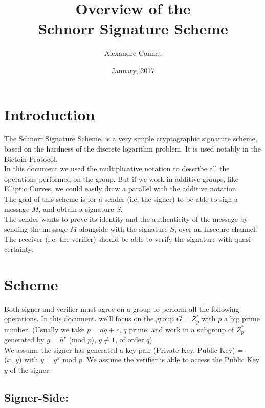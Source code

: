\documentclass{article}
\title{Overview of the\\Schnorr Signature Scheme}
\author{Alexandre Connat}
\date{January, 2017}
\begin{document}
\maketitle





\section{Introduction}

The Schnorr Signature Scheme, is a very simple cryptographic signature scheme, based on the hardness of the discrete logarithm problem. It is used notably in the Bictoin Protocol. \\
In this document we used the multiplicative notation to describe all the operations performed on the group. But if we work in additive groups, like Elliptic Curves, we could easily draw a parallel with the additive notation.  \\

\noindent
The goal of this scheme is for a sender (i.e: the signer) to be able to sign a message $M$, and obtain a signature $S$. \\
The sender wants to prove its identity and the authenticity of the message by sending the message $M$ alongside with the signature $S$, over an insecure channel. \\
The receiver (i.e: the verifier) should be able to verify the signature with quasi-certainty.







\section{Scheme}

Both signer and verifier must agree on a group to perform all the following operations. In this document, we'll focus on the group $G = Z_p^*$ with $p$ a big prime number. (Usually we take $p = aq +r$, $q$ prime; and work in a subgroup of $Z_p^*$ generated by $g = h^r$ (mod $p$), $g \not\equiv 1$, of order $q$) \\

\noindent
We assume the signer has generated a key-pair (Private Key, Public Key) = \\($x$, $y$) with $y = g^x$ mod $p$.
We assume the verifier is able to access the Public Key $y$ of the signer.


\subsection{Signer-Side:}
\end{document}
